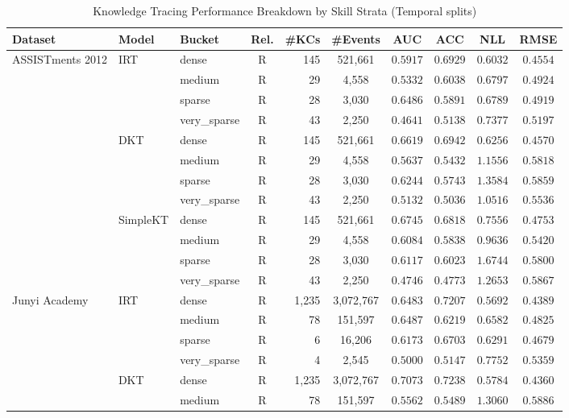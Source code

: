 ﻿\begin{table}[tbp]
\caption{Knowledge Tracing Performance Breakdown by Skill Strata (Temporal splits)}
\label{tab:temporal_strata}
\centering

\scriptsize
\setlength{\tabcolsep}{2.5pt}
\begin{tabular}{lllcrccccc}
\toprule
Dataset & Model & Bucket & Rel. & \#KCs & \#Events & AUC & ACC & NLL & RMSE \\
\midrule
ASSISTments 2012 & IRT & dense & R & 145 & 521,661 & $0.5917$ & $0.6929$ & $0.6032$ & $0.4554$ \\
 &  & medium & R & 29 & 4,558 & $0.5332$ & $0.6038$ & $0.6797$ & $0.4924$ \\
 &  & sparse & R & 28 & 3,030 & $0.6486$ & $0.5891$ & $0.6789$ & $0.4919$ \\
 &  & very\_sparse & R & 43 & 2,250 & $0.4641$ & $0.5138$ & $0.7377$ & $0.5197$ \\
 & DKT & dense & R & 145 & 521,661 & $0.6619$ & $0.6942$ & $0.6256$ & $0.4570$ \\
 &  & medium & R & 29 & 4,558 & $0.5637$ & $0.5432$ & $1.1556$ & $0.5818$ \\
 &  & sparse & R & 28 & 3,030 & $0.6244$ & $0.5743$ & $1.3584$ & $0.5859$ \\
 &  & very\_sparse & R & 43 & 2,250 & $0.5132$ & $0.5036$ & $1.0516$ & $0.5536$ \\
 & SimpleKT & dense & R & 145 & 521,661 & $0.6745$ & $0.6818$ & $0.7556$ & $0.4753$ \\
 &  & medium & R & 29 & 4,558 & $0.6084$ & $0.5838$ & $0.9636$ & $0.5420$ \\
 &  & sparse & R & 28 & 3,030 & $0.6117$ & $0.6023$ & $1.6744$ & $0.5800$ \\
 &  & very\_sparse & R & 43 & 2,250 & $0.4746$ & $0.4773$ & $1.2653$ & $0.5867$ \\
\midrule
Junyi Academy & IRT & dense & R & 1,235 & 3,072,767 & $0.6483$ & $0.7207$ & $0.5692$ & $0.4389$ \\
 &  & medium & R & 78 & 151,597 & $0.6487$ & $0.6219$ & $0.6582$ & $0.4825$ \\
 &  & sparse & R & 6 & 16,206 & $0.6173$ & $0.6703$ & $0.6291$ & $0.4679$ \\
 &  & very\_sparse & R & 4 & 2,545 & $0.5000$ & $0.5147$ & $0.7752$ & $0.5359$ \\
 & DKT & dense & R & 1,235 & 3,072,767 & $0.7073$ & $0.7238$ & $0.5784$ & $0.4360$ \\
 &  & medium & R & 78 & 151,597 & $0.5562$ & $0.5489$ & $1.3060$ & $0.5886$ \\

\end{tabular}
\end{table}
